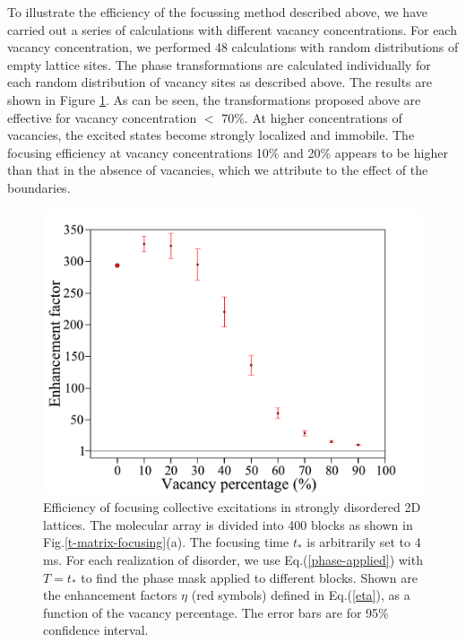 To illustrate the efficiency of the focussing method described above, we have carried out a series of calculations 
with different vacancy concentrations. For each vacancy concentration, we performed 48 calculations with random
 distributions of empty lattice sites. The phase transformations are calculated individually for each random 
distribution of vacancy sites as described above. The results are shown in Figure \ref{enhancement-vs-vacancy-t-matrix}. 
As can be seen, the transformations proposed above are effective for vacancy concentration $<$ 70\%. At higher 
concentrations of vacancies, the excited states become strongly localized and immobile. The focusing efficiency at
vacancy concentrations 10\% and 20\% appears to be higher than that in the absence of vacancies, which we attribute to the effect of 
the boundaries.
\begin{figure}[htbp]
\centering
\includegraphics[width=\linewidth]{enhancement-vs-vacancy-t-matrix-other.pdf}
\caption{Efficiency of focusing collective excitations in strongly disordered 2D lattices. The molecular 
array  is divided into 400 blocks as shown in Fig.\ref{t-matrix-focusing}(a). The focusing time $t_*$ is arbitrarily set to 4 ms. For each 
realization of disorder, we use Eq.(\ref{phase-applied}) with $T=t_*$ to find the phase mask applied to different blocks. 
Shown are the enhancement factors $\eta$ (red symbols) defined in Eq.(\ref{eta}), as a function of the vacancy percentage.
 The error bars are for 95\% confidence interval.
} 
\label{enhancement-vs-vacancy-t-matrix}
\end{figure}


